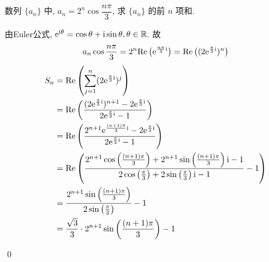 \begin{example}
    数列 \(\{a_n\}\) 中, \(a_n = 2^n \cos \dfrac{n\pi}{3}\), 求 \(\{a_n\}\) 的前 \(n\) 项和. 
\end{example}
\begin{jie}
    由Euler公式, \(\mathrm{e}^{\mathrm{i}\theta}=\cos \theta+\mathrm{i}\sin\theta,\theta\in\mathbb{R}\).
    故\[a_n \cos \frac{n\pi}{3} = 2^n \mathrm{Re}\left(\mathrm{e}^{\frac{n\pi}{3}\mathrm{i}}\right) = \mathrm{Re}\left((2\mathrm{e}^{\frac{\pi}{3}\mathrm{i}})^n\right) \]
    \begin{align*}
     S_n&= \mathrm{Re}\left(\sum_{j=1}^{n} (2\mathrm{e}^{\frac{\pi}{3}\mathrm{i}})^j \right)  \\
        &= \mathrm{Re}\left(\frac{(2\mathrm{e}^{\frac{\pi}{3}\mathrm{i}})^{n+1} - 2\mathrm{e}^{\frac{\pi}{3}\mathrm{i}}}{2\mathrm{e}^{\frac{\pi}{3}\mathrm{i}} - 1}\right) \\
        &= \mathrm{Re}\left(\frac{2^{n+1} \mathrm{e}^{\frac{(n+1)\pi}{3}\mathrm{i}} - 2\mathrm{e}^{\frac{\pi}{3}\mathrm{i}}}{2\mathrm{e}^{\frac{\pi}{3}\mathrm{i}} - 1}\right) \\
        &= \mathrm{Re}\left(\frac{2^{n+1} \cos\left(\frac{(n+1)\pi}{3}\right) + 2^{n+1} \sin\left(\frac{(n+1)\pi}{3}\right)\mathrm{i} - 1}{2\cos\left(\frac{\pi}{3}\right) + 2\sin\left(\frac{\pi}{3}\right)\mathrm{i} - 1} - 1\right) \\
        &= \frac{2^{n+1} \sin\left(\frac{(n+1)\pi}{3}\right)}{2\sin\left(\frac{\pi}{3}\right)} - 1 \\
        &= \frac{\sqrt{3}}{3} \cdot 2^{n+1} \sin\left(\frac{(n+1)\pi}{3}\right) - 1
        \end{align*}

    \qed



\end{jie}




\clearpage
